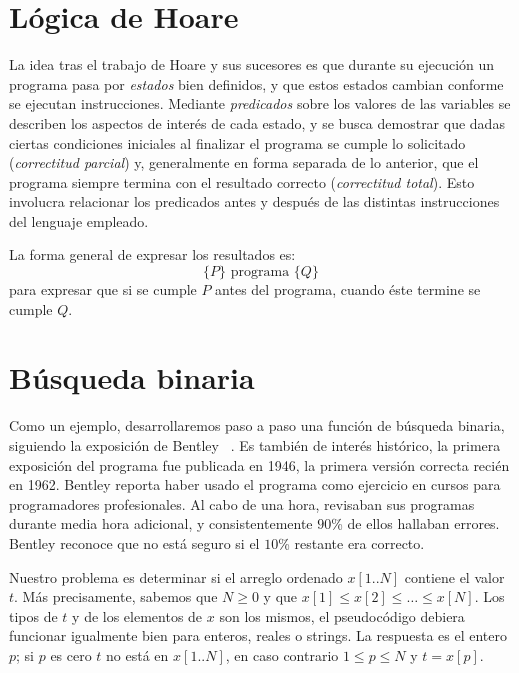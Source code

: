 \section{Lógica de Hoare}
\label{sec:logica-Hoare}

  La idea tras el trabajo de Hoare y sus sucesores
  es que durante su ejecución un programa pasa por \emph{estados}
  bien definidos,
  y que estos estados cambian conforme se ejecutan instrucciones.
  Mediante \emph{predicados}
  sobre los valores de las variables
  se describen los aspectos de interés de cada estado,
  y se busca demostrar que dadas ciertas condiciones iniciales
  al finalizar el programa se cumple lo solicitado
  (\emph{correctitud parcial})%
  y,
  generalmente en forma separada de lo anterior,
  que el programa siempre termina con el resultado correcto
  (\emph{correctitud total}).%
  Esto involucra relacionar los predicados antes y después
  de las distintas instrucciones del lenguaje empleado.

  La forma general de expresar los resultados es:
  \begin{equation*}
    \{P\} \text{\ programa\ } \{Q\}
  \end{equation*}
  para expresar que si se cumple \(P\) antes del programa,
  cuando éste termine se cumple \(Q\).

\section{Búsqueda binaria}
\label{sec:busqueda-binaria}

  Como un ejemplo,
  desarrollaremos paso a paso una función de búsqueda binaria,
  siguiendo la exposición de Bentley~%
    \cite[capítulo 4]{bentley00:_progr_pearl}.%
  Es también de interés histórico,
  la primera exposición del programa fue publicada en 1946,
  la primera versión correcta recién en 1962.
  Bentley reporta haber usado el programa
  como ejercicio en cursos para programadores profesionales.
  Al cabo de una hora,
  revisaban sus programas durante media hora adicional,
  y consistentemente \(90\)\% de ellos hallaban errores.
  Bentley reconoce
  que no está seguro si el \(10\)\% restante era correcto.

  Nuestro problema es determinar si el arreglo ordenado
  \(x[1..N]\) contiene el valor \(t\).
  Más precisamente,
  sabemos que \(N \ge 0\)
  y que \(x[1] \le x[2] \le \dotso \le x[N]\).
  Los tipos de \(t\)
  y de los elementos de \(x\) son los mismos,
  el pseudocódigo debiera funcionar igualmente bien para enteros,
  reales o \foreignlanguage{english}{strings}.
  La respuesta es el entero \(p\);
  si \(p\) es cero
  \(t\) no está en \(x[1..N]\),
  en caso contrario \(1 \le p \le N\)
  y \(t = x[p]\).

